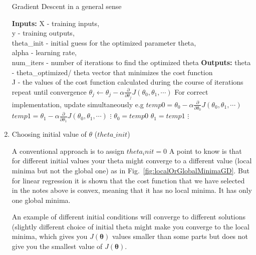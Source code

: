 \begin{enumerate}
 \begin{algorithm}
   \caption{Gradient Descent in a general sense}
    \begin{algorithmic}[1]
           \State \textbf{Inputs:} X - training inputs, \\
           \qquad \qquad y - training outputs, \\
           \qquad \qquad theta\_init - initial guess for the optimized parameter theta,\\ 
           \qquad \qquad alpha - learning rate, \\
           \qquad \qquad num\_iters - number of iterations to find the optimized theta
           \State \textbf{Outputs:} theta - theta\_optimized/ theta vector that minimizes the cost function \\
           \qquad \qquad J - the values of the cost function calculated during the course of iterations
    \State repeat until convergence {
    \State $\theta_j \leftarrow \theta_j - \alpha \frac{\partial}{\partial \theta_j}J(\theta_0, \theta_1, \cdots)$
    	 \State For correct implementation, update simultaneously e.g
	 \State 	\qquad  $temp0 = \theta_0 - \alpha \frac{\partial}{\partial \theta_0}J(\theta_0, \theta_1, \cdots)$
	 \State 	\qquad  $temp1 = \theta_1 - \alpha \frac{\partial}{\partial \theta_1}J(\theta_0, \theta_1, \cdots)$
          \State 	\qquad  \qquad $\vdots$
          \State 	\qquad  $\theta_0 = temp0$
	 \State 	\qquad  $\theta_1 = temp1$
	 \State 	\qquad  \qquad $\vdots$
		 }
       \EndFunction
\end{algorithmic}
\end{algorithm}

 \item Choosing initial value of $\theta$ ($theta\_init$)
 
 A conventional approach is to assign $theta_init = 0$
A point to know is that for different initial values your 
 theta might converge to a different value  (local minima 
 but not the global one) as in Fig.~\ref{fig:localOrGlobalMinimaGD}. 
 But for linear regression it is shown 
 that the cost function that we have selected in the notes 
 above is convex, meaning that it has no local minima. 
 It has only one global minima. 

An example of different initial conditions will converge 
 to different solutions (slightly different choice of initial 
 theta might make you converge to the local minima, 
 which gives you $J(\bm{\theta})$ values smaller than some 
 parts but does not give you the smallest value of $J(\bm{\theta})$.


\end{enumerate}
